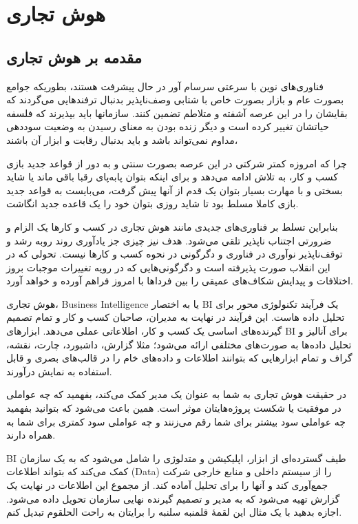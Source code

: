 \documentclass{llncs}
\begin{document}
\section {هوش تجاری}
\subsection{مقدمه بر هوش تجاری}
فناوری‌های نوین با سرعتی سرسام آور در حال پیشرفت هستند، بطوریکه جوامع بصورت عام و بازار بصورت خاص با شتابی وصف‌ناپذیر بدنبال ترفندهایی می‌گردند که بقایشان را در این عرصه آشفته و متلاطم تضمین کنند. سازمانها باید بپذیرند که فلسفه حیاتشان تغییر کرده است و دیگر زنده بودن به معنای رسیدن به وضعیت سوددهی مداوم نمی‌تواند باشد و باید بدنبال رقابت و ابزار آن باشند،

چرا که امروزه کمتر شرکتی در این عرصه بصورت سنتی و به دور از قواعد جدید بازی کسب و کار، به تلاش ادامه می‌دهد و برای اینکه بتوان پابه‌پای رقبا باقی ماند یا شاید بسختی و با مهارت بسیار بتوان یک قدم از آنها پیش گرفت، می‌بایست به قواعد جدید بازی کاملا مسلط بود تا شاید روزی بتوان خود را یک قاعده جدید انگاشت.

بنابراین تسلط بر فناوری‌های جدیدی مانند هوش تجاری در کسب و کارها یک الزام و ضرورتی اجتناب ناپذیر تلقی می‌شود. هدف نیز چیزی جز یادآوری روند روبه رشد و توقف‌ناپذیر نوآوری در فناوری و دگرگونی در نحوه کسب و کارها نیست. تحولی که در این انقلاب صورت پذیرفته است و دگرگونی‌هایی که در رویه تغییرات موجبات بروز اختلافات و پیدایش شکاف‌های عمیقی را بین فرداها با امروز فراهم آورده و خواهد آورد.

هوش تجاری، Business Intelligence یا به اختصار BI یک فرآیند تکنولوژی محور برای تحلیل داده هاست. این فرآیند در نهایت به مدیران، صاحبان کسب و کار و تمام تصمیم گیرنده‌های اساسی یک کسب و کار، اطلاعاتی عملی می‌دهد. ابزارهای BI برای آنالیز و تحلیل داده‌ها به صورت‌های مختلفی ارائه می‌شود؛ مثلا گزارش، داشبورد، چارت، نقشه، گراف و تمام ابزارهایی که بتوانند اطلاعات و داده‌های خام را در قالب‌های بصری و قابل استفاده به نمایش درآورند.

در حقیقت هوش تجاری به شما به عنوان یک مدیر کمک می‌کند، بفهمید که چه عواملی در موفقیت یا شکست پروژه‌هایتان موثر است. همین باعث می‌شود که بتوانید بفهمید چه عواملی سود بیشتر برای شما رقم می‌زنند و چه عواملی سود کمتری برای شما به همراه دارند.

BI طیف گسترده‌ای از ابزار، اپلیکیشن‌ و متدلوژی را شامل می‌شود که به یک سازمان کمک می‌کند که بتواند اطلاعات (Data) را از سیستم داخلی و منابع خارجی شرکت جمع‌آوری کند و آنها را برای تحلیل آماده کند. از مجموع این اطلاعات در نهایت یک گزارش تهیه می‌شود که به مدیر و تصمیم گیرنده نهایی سازمان تحویل داده می‌شود. اجازه بدهید با یک مثال این لقمۀ قلمنبه سلنبه را برایتان به راحت الحلقوم تبدیل کنم.
\end{document}
